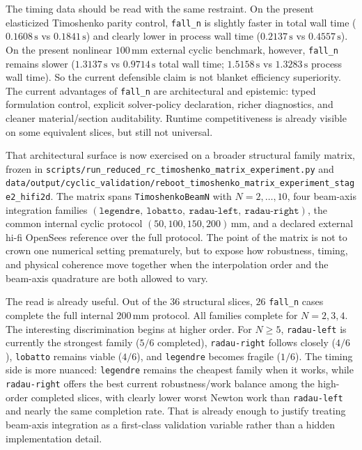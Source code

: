 The timing data should be read with the same restraint.  On the present
elasticized Timoshenko parity control, \texttt{fall\_n} is slightly faster in
total wall time (\(0.1608\,\mathrm{s}\) vs \(0.1841\,\mathrm{s}\)) and clearly
lower in process wall time (\(0.2137\,\mathrm{s}\) vs
\(0.4557\,\mathrm{s}\)).  On the present nonlinear
\(100\,\mathrm{mm}\) external cyclic benchmark, however, \texttt{fall\_n}
remains slower
(\(1.3137\,\mathrm{s}\) vs \(0.9714\,\mathrm{s}\) total wall time;
\(1.5158\,\mathrm{s}\) vs \(1.3283\,\mathrm{s}\) process wall time).  So the
current defensible claim is not blanket efficiency superiority.  The current
advantages of \texttt{fall\_n} are architectural and epistemic: typed
formulation control, explicit solver-policy declaration, richer diagnostics,
and cleaner material/section auditability.  Runtime competitiveness is already
visible on some equivalent slices, but still not universal.

That architectural surface is now exercised on a broader structural family
matrix, frozen in
\texttt{scripts/run\_reduced\_rc\_timoshenko\_matrix\_experiment.py} and
\texttt{data/output/cyclic\_validation/reboot\_timoshenko\_matrix\_experiment\_stage2\_hifi2d}.
The matrix spans \texttt{TimoshenkoBeamN} with \(N=2,\dots,10\), four
beam-axis integration families
\((\texttt{legendre},\ \texttt{lobatto},\ \texttt{radau-left},\ \texttt{radau-right})\),
the common internal cyclic protocol
\((50,100,150,200)\,\mathrm{mm}\), and a declared external hi-fi OpenSees
reference over the full protocol.  The point of the matrix is not to crown one
numerical setting prematurely, but to expose how robustness, timing, and
physical coherence move together when the interpolation order and the
beam-axis quadrature are both allowed to vary.

The read is already useful.  Out of the \(36\) structural slices, \(26\)
\texttt{fall\_n} cases complete the full internal
\(200\,\mathrm{mm}\) protocol.  All families complete for \(N=2,3,4\).  The
interesting discrimination begins at higher order.  For \(N\ge5\),
\texttt{radau-left} is currently the strongest family (\(5/6\) completed),
\texttt{radau-right} follows closely (\(4/6\)), \texttt{lobatto} remains
viable (\(4/6\)), and \texttt{legendre} becomes fragile (\(1/6\)).  The timing
side is more nuanced: \texttt{legendre} remains the cheapest family when it
works, while \texttt{radau-right} offers the best current robustness/work
balance among the high-order completed slices, with clearly lower worst Newton
work than \texttt{radau-left} and nearly the same completion rate.  That is
already enough to justify treating beam-axis integration as a first-class
validation variable rather than a hidden implementation detail.

